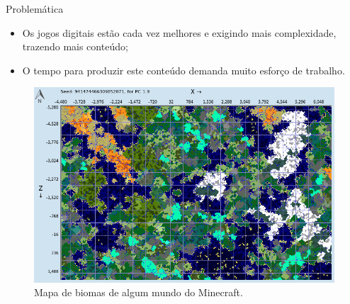 



\begin{frame}{Problemática}
    \begin{itemize} \setlength\itemsep{1em}
        \item Os jogos digitais estão cada vez melhores e exigindo mais
        complexidade, trazendo mais conteúdo;
        \item O tempo para produzir este conteúdo demanda muito esforço de trabalho.
    \end{itemize}
    
    \begin{figure}[H]
        \centering
        \includegraphics[width=.6\textwidth, height=.5\textheight]{img/chunkbasebiomes}
        \caption{Mapa de biomas de algum mundo do Minecraft.}
        \label{fig:chunkbasebiomes}
    \end{figure}
    
\end{frame}


%    

